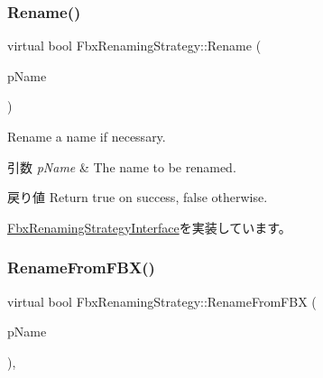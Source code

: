 \subsubsection{\texorpdfstring{Rename()}{Rename()}}
{\footnotesize\ttfamily virtual bool Fbx\+Renaming\+Strategy\+::\+Rename (\begin{DoxyParamCaption}\item[{\hyperlink{class_fbx_name_handler}{Fbx\+Name\+Handler} \&}]{p\+Name }\end{DoxyParamCaption})\hspace{0.3cm}{\ttfamily [virtual]}}

Rename a name if necessary. 
\begin{DoxyParams}{引数}
{\em p\+Name} & The name to be renamed. \\
\hline
\end{DoxyParams}
\begin{DoxyReturn}{戻り値}
Return {\ttfamily true} on success, {\ttfamily false} otherwise. 
\end{DoxyReturn}


\hyperlink{class_fbx_renaming_strategy_interface_a1b91016c68dd9c7031624026fd39638a}{Fbx\+Renaming\+Strategy\+Interface}を実装しています。

\mbox{\label{class_fbx_renaming_strategy_aefd287925863f4cbf7c1416b4bd1b419}} 
\subsubsection{\texorpdfstring{Rename\+From\+F\+B\+X()}{RenameFromFBX()}}
{\footnotesize\ttfamily virtual bool Fbx\+Renaming\+Strategy\+::\+Rename\+From\+F\+BX (\begin{DoxyParamCaption}\item[{\hyperlink{class_fbx_name_handler}{Fbx\+Name\+Handler} \&}]{p\+Name }\end{DoxyParamCaption})\hspace{0.3cm}{\ttfamily [protected]}, {\ttfamily [virtual]}}

\mbox{\label{class_fbx_renaming_strategy_aa210a797aa92ff19ab61ce5a91c86228}} 
